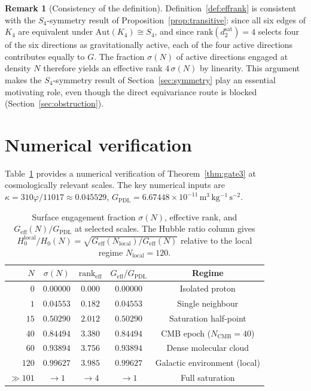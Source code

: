 \documentclass[11pt,a4paper]{article}
\theoremstyle{definition}
\newtheorem{remark}[theorem]{Remark}
\newcommand{\Kfour}{K_4}
\newcommand{\vp}{\varphi}
\newcommand{\kap}{\kappa}
\newcommand{\GPDL}{G_{\mathrm{PDL}}}
\newcommand{\Geff}{G_{\mathrm{eff}}}
\newcommand{\sig}{\sigma}
\newcommand{\dmap}{d_2}
\newcommand{\Ncmb}{N_{\mathrm{CMB}}}
\newcommand{\Nlocal}{N_{\mathrm{local}}}
\begin{document}
\begin{remark}[Consistency of the definition]
Definition~\ref{def:effrank} is consistent with the $S_4$-symmetry result of Proposition~\ref{prop:transitive}: since all six edges of $\Kfour$ are equivalent under $\mathrm{Aut}(\Kfour) \cong S_4$, and since $\mathrm{rank}(\dmap^{\mathrm{sat}}) = 4$ selects four of the six directions as gravitationally active, each of the four active directions contributes equally to $G$. The fraction $\sig(N)$ of active directions engaged at density $N$ therefore yields an effective rank $4\,\sig(N)$ by linearity. This argument makes the $S_4$-symmetry result of Section~\ref{sec:symmetry} play an essential motivating role, even though the direct equivariance route is blocked (Section~\ref{sec:obstruction}).
\end{remark}

\section{Numerical verification}
\label{sec:numerical}

Table~\ref{tab:sigma} provides a numerical verification of Theorem~\ref{thm:gate3} at cosmologically relevant scales. The key numerical inputs are $\kap = 310\vp/11017 \approx 0.045529$, $\GPDL = 6.67448\times10^{-11}\,\mathrm{m^3\,kg^{-1}\,s^{-2}}$.

\begin{table}[ht]
\centering
\caption{Surface engagement fraction $\sig(N)$, effective rank, and $\Geff(N)/\GPDL$ at selected scales. The Hubble ratio column gives $H_0^{\mathrm{local}}/H_0(N) = \sqrt{\Geff(\Nlocal)/\Geff(N)}$ relative to the local regime $\Nlocal = 120$.}
\label{tab:sigma}
\bigskip
\begin{tabular}{rcccc}
\toprule
$N$ & $\sig(N)$ & $\mathrm{rank}_{\mathrm{eff}}$ & $\Geff/\GPDL$ & Regime \\
\midrule
$0$ & $0.00000$ & $0.000$ & $0.00000$ & Isolated proton \\
$1$ & $0.04553$ & $0.182$ & $0.04553$ & Single neighbour \\
$15$ & $0.50290$ & $2.012$ & $0.50290$ & Saturation half-point \\
$40$ & $0.84494$ & $3.380$ & $0.84494$ & CMB epoch ($\Ncmb = 40$) \\
$60$ & $0.93894$ & $3.756$ & $0.93894$ & Dense molecular cloud \\
$120$ & $0.99627$ & $3.985$ & $0.99627$ & Galactic environment (local) \\
$\gg 101$ & $\to 1$ & $\to 4$ & $\to 1$ & Full saturation \\
\bottomrule
\end{tabular}
\end{table}
\end{document}
